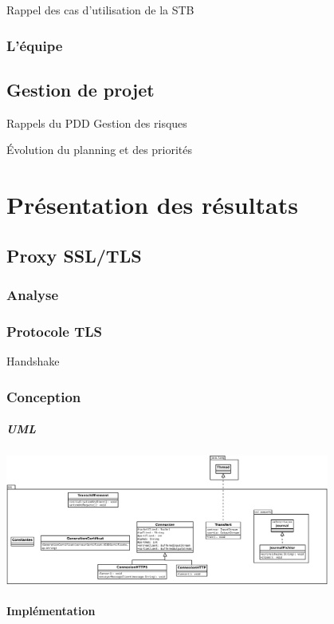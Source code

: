\documentclass[a4paper,11pt,french]{report}
\begin{document}
Rappel des cas d'utilisation de la STB

\subsection{L'équipe}

\section{Gestion de projet}
Rappels du PDD
Gestion des risques

Évolution du planning et des priorités

\chapter{Présentation des résultats}
\section{Proxy SSL/TLS}
\subsection{Analyse}
\subsection{Protocole TLS}
Handshake

\subsection{Conception}
\paragraph{UML}
\includegraphics[width=0.8\textwidth]{images/uml.pdf}

\subsubsection*{Implémentation}
\end{document}
